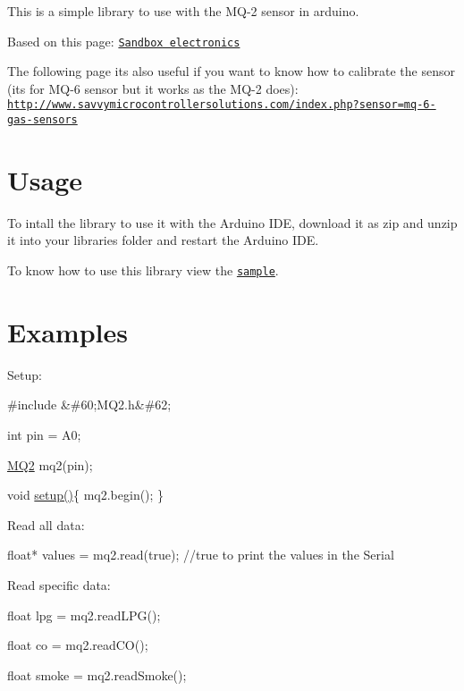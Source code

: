This is a simple library to use with the M\+Q-\/2 sensor in arduino.

Based on this page\+: \href{http://sandboxelectronics.com/?p=165}{\tt Sandbox electronics}

The following page it\textquotesingle{}s also useful if you want to know how to calibrate the sensor (it\textquotesingle{}s for M\+Q-\/6 sensor but it works as the M\+Q-\/2 does)\+: \href{http://www.savvymicrocontrollersolutions.com/index.php?sensor=mq-6-gas-sensors}{\tt http\+://www.\+savvymicrocontrollersolutions.\+com/index.\+php?sensor=mq-\/6-\/gas-\/sensors}

\section*{Usage }

To intall the library to use it with the Arduino I\+DE, download it as zip and unzip it into your \textquotesingle{}libraries\textquotesingle{} folder and restart the Arduino I\+DE.

To know how to use this library view the \href{/arduino_sample/arduino_sample.ino}{\tt sample}. \section*{Examples }

Setup\+: 
\begin{DoxyPre}{\ttfamily 
  #include \&\#60;MQ2.h\&\#62;}\end{DoxyPre}



\begin{DoxyPre}{\ttfamily   int pin = A0;}\end{DoxyPre}



\begin{DoxyPre}{\ttfamily   \hyperlink{class_m_q2}{MQ2} mq2(pin);}\end{DoxyPre}



\begin{DoxyPre}{\ttfamily   void \hyperlink{echo__server_8cpp_a4fc01d736fe50cf5b977f755b675f11d}{setup()}\{
    mq2.begin();
  \}
}\end{DoxyPre}


Read all data\+: 
\begin{DoxyPre}{\ttfamily 
  float* values = mq2.read(true); //true to print the values in the Serial
}\end{DoxyPre}


Read specific data\+: 
\begin{DoxyPre}{\ttfamily 
  float lpg = mq2.readLPG();}\end{DoxyPre}



\begin{DoxyPre}{\ttfamily   float co = mq2.readCO();}\end{DoxyPre}



\begin{DoxyPre}{\ttfamily   float smoke = mq2.readSmoke();
}\end{DoxyPre}
 